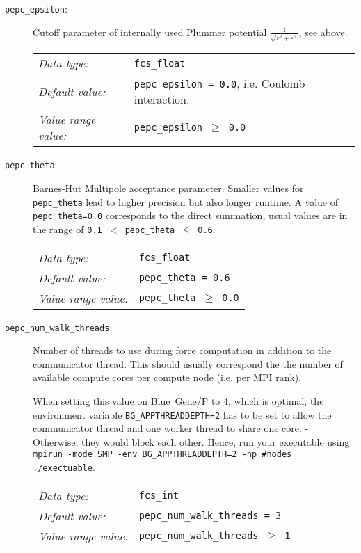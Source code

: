 \begin{description}
  \item[\texttt{pepc\_epsilon}:] Cutoff parameter of internally used Plummer potential 
	$\frac{1}{\sqrt{r^2+\varepsilon^2}}$, see above.
	
	\begin{tabular}{ll}
	   \textit{Data type:}         & \texttt{fcs\_float} \\
	   \textit{Default value:}     & \texttt{pepc\_epsilon = 0.0}, i.e. Coulomb interaction. \\
	   \textit{Value range value:} & \texttt{pepc\_epsilon $\geq$ 0.0}
	\end{tabular}

  \item[\texttt{pepc\_theta}:] Barnes-Hut Multipole acceptance parameter. Smaller values for 
	\texttt{pepc\_theta} lead to higher precision but also longer runtime. A value of
	\texttt{pepc\_theta=0.0} corresponds to the direct  summation, usual values 
	are in the range of \texttt{0.1 $<$ pepc\_theta $\leq$ 0.6}.

	\begin{tabular}{ll}
	   \textit{Data type:}         & \texttt{fcs\_float} \\
	   \textit{Default value:}     & \texttt{pepc\_theta = 0.6} \\
	   \textit{Value range value:} & \texttt{pepc\_theta $\geq$ 0.0}
	\end{tabular}


  \item[\texttt{pepc\_num\_walk\_threads}:] Number of threads to use during force computation in 
	addition to the communicator thread. This should usually correspond the the number of
	available compute cores per compute node (i.e. per MPI rank).

	When setting this value on Blue~Gene/P to 4, which is optimal, the environment variable
	\texttt{BG\_APPTHREADDEPTH=2} has to be set to allow the communicator thread and one worker
	thread to share one core. - Otherwise, they would block each other. Hence, run your 
	executable using \texttt{mpirun -mode SMP -env BG\_APPTHREADDEPTH=2 -np \#nodes ./exectuable}.

	\begin{tabular}{ll}
	   \textit{Data type:}         & \texttt{fcs\_int} \\
	   \textit{Default value:}     & \texttt{pepc\_num\_walk\_threads = 3} \\
	   \textit{Value range value:} & \texttt{pepc\_num\_walk\_threads $\geq$ 1}
	\end{tabular}


\end{description}
